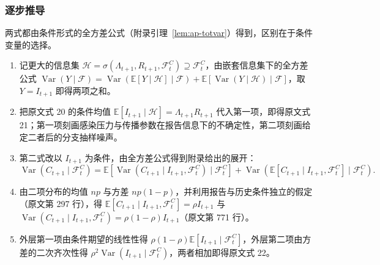\subsubsection{逐步推导}

两式都由条件形式的全方差公式（附录引理~\ref{lem:ap-totvar}）得到，区别在于条件变量的选择。
\begin{enumerate}
\item 记更大的信息集 $\mathcal H=\sigma(\Lambda_{t+1},R_{t+1},\mathcal F_t^C)\supseteq\mathcal F_t^C$，由嵌套信息集下的全方差公式 $\operatorname{Var}(Y\mid\mathcal F)=\operatorname{Var}(\mathbb E[Y\mid\mathcal H]\mid\mathcal F)+\mathbb E[\operatorname{Var}(Y\mid\mathcal H)\mid\mathcal F]$，取 $Y=I_{t+1}$ 即得两项之和。
\item 把原文式 20 的条件均值 $\mathbb E[I_{t+1}\mid\mathcal H]=\Lambda_{t+1}R_{t+1}$ 代入第一项，即得原文式 21；第一项刻画感染压力与传播参数在报告信息下的不确定性，第二项刻画给定二者后的分支抽样噪声。
\item 第二式改以 $I_{t+1}$ 为条件，由全方差公式得到附录给出的展开：
\begin{equation*}
\operatorname{Var}(C_{t+1} \mid \mathcal{F}_t^C) = \mathbb{E}[\operatorname{Var}(C_{t+1} \mid I_{t+1}, \mathcal{F}_t^C) \mid \mathcal{F}_t^C] + \operatorname{Var}(\mathbb{E}[C_{t+1} \mid I_{t+1}, \mathcal{F}_t^C] \mid \mathcal{F}_t^C).
\tag*{原文第 769 行}
\end{equation*}
\item 由二项分布的均值 $np$ 与方差 $np(1-p)$，并利用报告与历史条件独立的假定（原文第 297 行），得 $\mathbb E[C_{t+1}\mid I_{t+1},\mathcal F_t^C]=\rho I_{t+1}$ 与 $\operatorname{Var}(C_{t+1}\mid I_{t+1},\mathcal F_t^C)=\rho(1-\rho)I_{t+1}$（原文第 771 行）。
\item 外层第一项由条件期望的线性性得 $\rho(1-\rho)\mathbb E[I_{t+1}\mid\mathcal F_t^C]$，外层第二项由方差的二次齐次性得 $\rho^2\operatorname{Var}(I_{t+1}\mid\mathcal F_t^C)$，两者相加即得原文式 22。
\end{enumerate}

